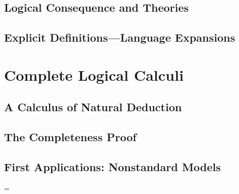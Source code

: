 

\subsection{Logical Consequence and Theories}



\subsection{Explicit Definitions---Language Expansions}



\vfill\break

\section{Complete Logical Calculi}

\subsection{A Calculus of Natural Deduction}



\subsection{The Completeness Proof}



\subsection{First Applications: Nonstandard Models}



\vfill\break

\parskip=\z@
\def\currsubsection{Index}

\index

\bye


